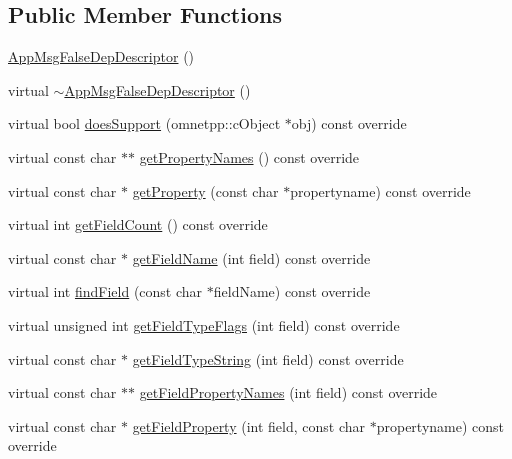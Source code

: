 \subsection*{Public Member Functions}
\begin{DoxyCompactItemize}
\item 
\hyperlink{class_app_msg_false_dep_descriptor_a4ca99cc9f908534f473db357ba25ff2d}{App\+Msg\+False\+Dep\+Descriptor} ()
\item 
virtual \hyperlink{class_app_msg_false_dep_descriptor_a8d7c2d85fad2a90a6cd377ae150345a0}{$\sim$\+App\+Msg\+False\+Dep\+Descriptor} ()
\item 
virtual bool \hyperlink{class_app_msg_false_dep_descriptor_ac3fc2e2a9ff6986bec98c724590aa456}{does\+Support} (omnetpp\+::c\+Object $\ast$obj) const override
\item 
virtual const char $\ast$$\ast$ \hyperlink{class_app_msg_false_dep_descriptor_a550ade508a3c3d84d5781aba6bf02ec8}{get\+Property\+Names} () const override
\item 
virtual const char $\ast$ \hyperlink{class_app_msg_false_dep_descriptor_ac5650d0cbf554966c9fa8a1add231af7}{get\+Property} (const char $\ast$propertyname) const override
\item 
virtual int \hyperlink{class_app_msg_false_dep_descriptor_ade54239f119054d3995dc4e7570718a9}{get\+Field\+Count} () const override
\item 
virtual const char $\ast$ \hyperlink{class_app_msg_false_dep_descriptor_ae89f0e9b564147c2faa20b8ffc47a2bb}{get\+Field\+Name} (int field) const override
\item 
virtual int \hyperlink{class_app_msg_false_dep_descriptor_a9c9cfe9dbacb64401882bc7c4d0e7ef1}{find\+Field} (const char $\ast$field\+Name) const override
\item 
virtual unsigned int \hyperlink{class_app_msg_false_dep_descriptor_a09a72b309888cf637248490b2482e435}{get\+Field\+Type\+Flags} (int field) const override
\item 
virtual const char $\ast$ \hyperlink{class_app_msg_false_dep_descriptor_a83e838bc58a595cfbfe43a9a4ccabb2e}{get\+Field\+Type\+String} (int field) const override
\item 
virtual const char $\ast$$\ast$ \hyperlink{class_app_msg_false_dep_descriptor_a73becb0b27a833d32fde15e0b9b87572}{get\+Field\+Property\+Names} (int field) const override
\item 
virtual const char $\ast$ \hyperlink{class_app_msg_false_dep_descriptor_a9737ecde44ab7bd573cdd94edc494b2f}{get\+Field\+Property} (int field, const char $\ast$propertyname) const override

\end{DoxyCompactItemize}
